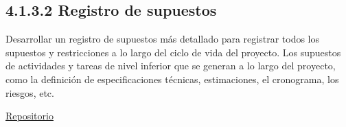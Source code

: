 \documentclass[letterpaper,12pt,openright,oneside]{article}
\theoremstyle{plain}
\begin{document}
\subsection*{4.1.3.2 Registro de supuestos}

Desarrollar un registro de supuestos más detallado para registrar todos los supuestos y restricciones a lo largo del ciclo de vida del proyecto.
Los supuestos de actividades y tareas de nivel inferior que se generan a lo largo del proyecto, como la definición de especificaciones técnicas, estimaciones, el cronograma, los riesgos, etc. 

\href{https://github.com/LAAngeles/Seminario_VI_2023-1/}{Repositorio}
% 
% 
\end{document}
